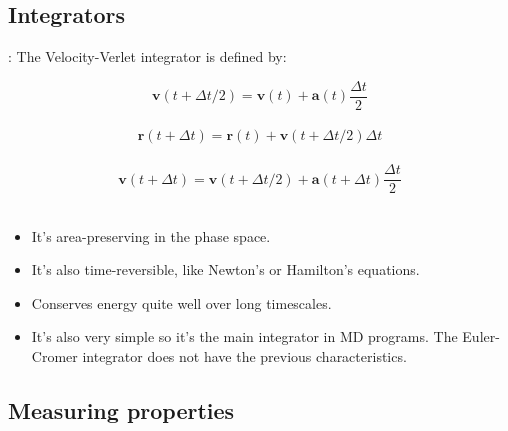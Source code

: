 \documentclass{beamer}
\begin{document}
		\subsection{Integrators}
				
			\begin{frame}{\secname : \subsecname}
				The Velocity-Verlet integrator is defined by:
		
				\begin{equation*}\mathbf{v}\left(t+\Delta t/2\right)=\mathbf{v}\left(t\right)+\mathbf{a}\left(t\right)\frac{\Delta t}{2}\end{equation*}\\
		
				\begin{equation*}\mathbf{r}\left(t+\Delta t\right)=\mathbf{r}\left(t\right)+\mathbf{v}\left(t+\Delta t/2\right)\Delta t\end{equation*}\\
		
				\begin{equation*}\mathbf{v}\left(t+\Delta t\right)=\mathbf{v}\left(t+\Delta t/2\right)+\mathbf{a}\left(t+\Delta t\right)\frac{\Delta t}{2}\end{equation*}\\
				
				\begin{itemize}
					\item It's area-preserving in the phase space.
					\item It's also time-reversible, like Newton's or Hamilton's equations.
					\item Conserves energy quite well over long timescales.
					\item It's also very simple so it's the main integrator in MD programs. The Euler-Cromer integrator does not have the previous characteristics.
				\end{itemize}
			\end{frame}

		\subsection{Measuring properties}
		
\end{document}

